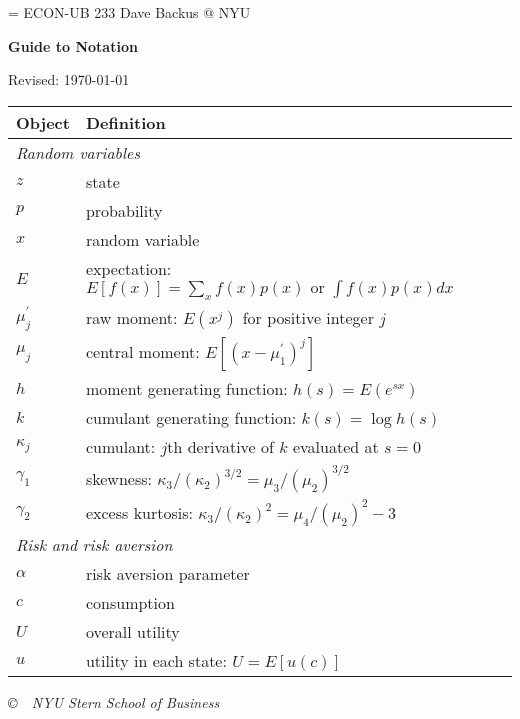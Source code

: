 \documentclass[11pt]{article}
\begin{document}
\parskip=\bigskipamount
\parindent=0.0in
\thispagestyle{empty}
{\large ECON-UB 233 \hfill Dave Backus @ NYU}

\bigskip\bigskip
\centerline{\Large \bf Guide to Notation}
\centerline{Revised: \today}

\bigskip
\begin{center}
\begin{tabular}{ll}
\toprule
Object    &  Definition    \\
\midrule
\multicolumn{2}{l}{\it Random variables}   \\
$z$ \hspace*{5em}& state \\
$p$ & probability \\
$x$ & random variable \\
$E$ & expectation:  $E[f(x)] = \sum_x f(x) p(x) \mbox{ or } \int f(x) p(x) dx $ \\ %
$\mu_j^\prime$ & raw moment: $ E(x^j)$ for positive integer $j$ \\
$\mu_j$         & central moment: $ E[(x-\mu_1^\prime)^j]$ \\
$h$         &  moment generating function:  $h(s) = E(e^{sx})$ \\
$k$         &  cumulant generating function:  $k(s) = \log h(s) $ \\
$\kappa_j$      & cumulant:  $j$th derivative of $k$ evaluated at $s=0$ \\

$\gamma_1$ & skewness:  $\kappa_3 /(\kappa_2)^{3/2} = \mu_3 /(\mu_2)^{3/2}$ \\
$\gamma_2$ & excess kurtosis:  $\kappa_3 /(\kappa_2)^{2} = \mu_4 /(\mu_2)^{2} - 3$ \\

\multicolumn{2}{l}{\it Risk and risk aversion}   \\
$\alpha$    &  risk aversion parameter \\
$c$         & consumption \\
$U$         & overall utility \\
$u$         & utility in each state:  $ U = E [u(c)] $ \\
\bottomrule
\end{tabular}
\end{center}

\vfill \centerline{\it \copyright \ \number\year \
NYU Stern School of Business}
\end{document}
